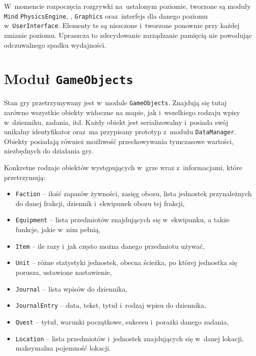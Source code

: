 \documentclass[licencjacka]{pracamgr}
\begin{document}
    W~momencie rozpoczęcia rozgrywki na~ustalonym poziomie, tworzone są moduły \texttt{Mind} \texttt{PhysicsEngine},
    , \texttt{Graphics} oraz~interfejs dla danego poziomu w~\texttt{UserInterface}. Elementy te są niszczone i~tworzone
    ponownie przy każdej zmianie poziomu. Upraszcza to zdecydowanie zarządzanie pamięcią nie powodując odczuwalnego spadku wydajności.

  \section{Moduł \texttt{GameObjects}}
    Stan gry przetrzymywany jest w~module \texttt{GameObjects}. Znajdują się tutaj zarówno wszystkie obiekty widoczne na
    mapie, jak i~wszelkiego rodzaju wpisy w~dzienniku, zadania, itd. Każdy obiekt jest serializowalny i~posiada swój unikalny
    identyfikator oraz~ma przypisany prototyp z~modułu \texttt{DataManager}. Obiekty posiadają również możliwość przechowywania
    tymczasowe wartości, niezbędnych do działania gry.

    Konkretne rodzaje obiektów występujących w~grze wraz z~informacjami, które przetrzymują:
    \begin{itemize}
      \item \texttt{Faction} -- ilość zapasów żywności, zasięg obozu, lista jednostek przynależnych do danej
	frakcji, dziennik i~ekwipunek obozu tej frakcji,
      \item \texttt{Equipment} -- lista przedmiotów znajdujących się w~ekwipunku, a także funkcje, jakie w~nim pełnią,
      \item \texttt{Item} --  ile razy i~jak często można danego przedmiotu używać,
      \item \texttt{Unit} -- różne statystyki jednostek, obecna ścieżka, po której jednostka się porusza, ustawione nastawienie,
      \item \texttt{Journal} -- lista wpisów do dziennika,
      \item \texttt{JournalEntry} -- data, tekst, tytuł i~rodzaj wpisu do dziennika,
      \item \texttt{Quest} -- tytuł, warunki początkowe, sukcesu i~porażki danego zadania,
      \item \texttt{Location} -- lista przedmiotów i~jednostek znajdujących się w~danej lokacji, maksymalna pojemność lokacji.
    \end{itemize}

\end{document}
